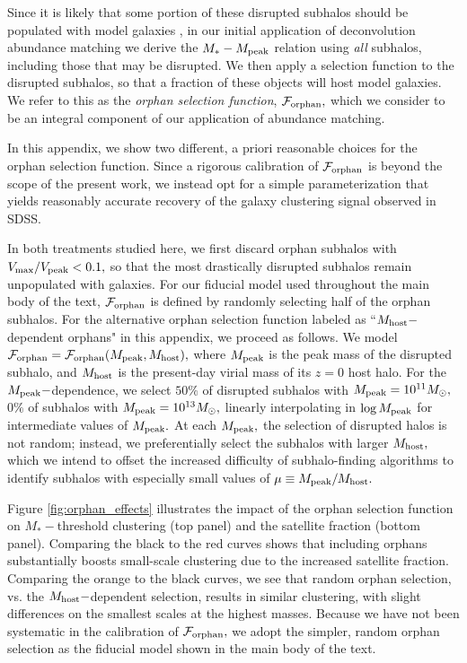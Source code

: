 \documentclass[usenatbib,usegraphicx,letterpaper]{mn2e}
\newcommand{\mstar}{M_{\ast}}
\newcommand{\mpeak}{M_{\rm peak}}
\newcommand{\mhost}{M_{\rm host}}
\newcommand{\msun}{M_\odot}
\begin{document}
Since it is likely that some portion of these disrupted subhalos should be populated with model galaxies \citep{guo_white13, campbell_etal17}, in our initial application of deconvolution abundance matching we derive the $\mstar-\mpeak$ relation using {\em all} subhalos, including those that may be disrupted. We then apply a selection function to the disrupted subhalos, so that a fraction of these objects will host model galaxies. We refer to this as the {\em orphan selection function}, $\mathcal{F}_{\rm orphan},$ which we consider to be an integral component of our application of abundance matching.

In this appendix, we show two different, a priori reasonable choices for the orphan selection function. Since a rigorous calibration of $\mathcal{F}_{\rm orphan}$ is beyond the scope of the present work, we instead opt for a simple parameterization that yields reasonably accurate recovery of the galaxy clustering signal observed in SDSS.

In both treatments studied here, we first discard orphan subhalos with $V_{\rm max}/V_{\rm peak}<0.1,$ so that the most drastically disrupted subhalos remain unpopulated with galaxies. For our fiducial model used throughout the main body of the text, $\mathcal{F}_{\rm orphan}$ is defined by randomly selecting half of the orphan subhalos. For the alternative orphan selection function labeled as ``$M_{\rm host}-$dependent orphans" in this appendix, we proceed as follows. We model $\mathcal{F}_{\rm orphan}=\mathcal{F}_{\rm orphan}(M_{\rm peak},M_{\rm host}),$ where $\mpeak$ is the peak mass of the disrupted subhalo, and $\mhost$ is the present-day virial mass of its $z=0$ host halo. For the $\mpeak-$dependence, we select $50\%$ of disrupted subhalos with $\mpeak=10^{11}\msun,$ $0\%$ of subhalos with $\mpeak=10^{13}\msun,$ linearly interpolating in $\log\mpeak$ for intermediate values of $\mpeak.$ At each $\mpeak,$ the selection of disrupted halos is not random; instead, we preferentially select the subhalos with larger $\mhost,$ which we intend to offset the increased difficulty of subhalo-finding algorithms to identify subhalos with especially small values of  $\mu\equiv\mpeak/\mhost.$

Figure \ref{fig:orphan_effects} illustrates the impact of the orphan selection function on $\mstar-$threshold clustering (top panel) and the satellite fraction (bottom panel). Comparing the black to the red curves shows that including orphans substantially boosts small-scale clustering due to the increased satellite fraction. Comparing the orange to the black curves, we see that random orphan selection, vs. the $M_{\rm host}-$dependent selection, results in similar clustering, with slight differences on the smallest scales at the highest masses. Because we have not been systematic in the calibration of $\mathcal{F}_{\rm orphan},$ we adopt the simpler, random orphan selection as the fiducial model shown in the main body of the text.
\end{document}
